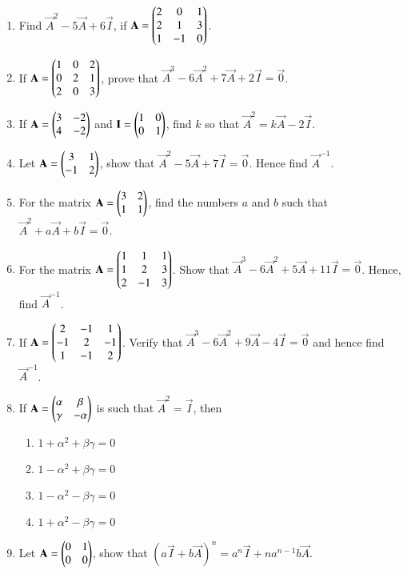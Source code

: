\begin{enumerate}[label=\thesubsection.\arabic*,ref=\thesubsection.\theenumi]
\item Find $\vec{A}^2-5\vec{A}+6\vec{I}$, if $\mathbf{A}=\begin{pmatrix}
2 & 0 & 1 \\ 2 & 1 & 3 \\ 1 & -1 & 0\end{pmatrix}$.
\item If $\mathbf{A}=\begin{pmatrix}1 & 0 & 2 \\ 0 & 2 & 1 \\ 2 & 0 & 3\end{pmatrix}$, prove that $\vec{A}^3-6\vec{A}^2+7\vec{A}+2\vec{I}=\vec{0}$.
\item If $\mathbf{A}=\begin{pmatrix}3 & -2 \\ 4 & -2\end{pmatrix}$ and $\mathbf{I}=\begin{pmatrix}1 & 0 \\ 0 & 1\end{pmatrix}$, find $k$ so that $\vec{A}^2=k\vec{A}-2\vec{I}$.
\item Let $\mathbf{A}=\begin{pmatrix}3 & 1 \\ -1 & 2\end{pmatrix}$, show that $\vec{A}^2-5\vec{A}+7\vec{I}=\vec{0}$. Hence find $\vec{A}^{-1}$.
\item For the matrix $\mathbf{A}=\begin{pmatrix}3 & 2 \\ 1 & 1\end{pmatrix}$, find the numbers $a$ and $b$ such that $\vec{A}^2+a\vec{A}+b\vec{I}=\vec{0}$.
\item For the matrix $\mathbf{A}=\begin{pmatrix}1 & 1 & 1 \\ 1 & 2 & 3 \\ 2 & -1 & 3\end{pmatrix}$. Show that $\vec{A}^3-6\vec{A}^2+5\vec{A}+11\vec{I}=\vec{0}$. Hence, find $\vec{A}^{-1}$.
\item If $\mathbf{A}=\begin{pmatrix}2 & -1 & 1 \\ -1 & 2 & -1 \\ 1 & -1 & 2\end{pmatrix}$. Verify that $\vec{A}^3-6\vec{A}^2+9\vec{A}-4\vec{I}=\vec{0}$ and hence find $\vec{A}^{-1}$.
\item If $\mathbf{A}=\begin{pmatrix}\alpha& \beta \\ \gamma& -\alpha\end{pmatrix}$ is such that $\vec{A}^2= \vec{I}$, then
\begin{enumerate} 
\item $1+ \alpha^2+ \beta \gamma=0$
\item $1-\alpha^2+ \beta \gamma=0$
\item $1-\alpha^2- \beta \gamma=0$
\item $1+\alpha^2- \beta \gamma=0$ 
\end{enumerate}
\item Let $\mathbf{A}=\begin{pmatrix}0 & 1\\ 0 & 0\end{pmatrix}$, show that $(a\vec{I}+b\vec{A})^n= a^n\vec{I}+na^{n-1} b\vec{A}$.

\end{enumerate}
